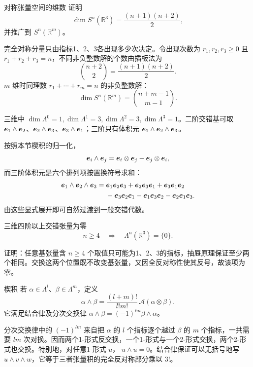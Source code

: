 \begin{advexamplebox}{对称张量空间的维数}\label{advA3:ex:symmetric-dimension}
证明
\[
 \dim S^n(\mathbb R^3)=\frac{(n+1)(n+2)}2,
\]
并推广到 $S^n(\mathbb R^m)$。

\AQSensors
\end{advexamplebox}
\begin{advsolution}
\AASensors

完全对称分量只由指标1、2、3各出现多少次决定。令出现次数为
$r_1,r_2,r_3\ge0$ 且 $r_1+r_2+r_3=n$，不同非负整数解的个数由插板法为
\[
 \binom{n+2}{2}=\frac{(n+1)(n+2)}2.
\]
$m$ 维时同理数 $r_1+\cdots+r_m=n$ 的非负整数解：
\[
 \boxed{\dim S^n(\mathbb R^m)=\binom{n+m-1}{m-1}}.
\]
\end{advsolution}

三维中 $\dim\Lambda^0=1,\dim\Lambda^1=3,\dim\Lambda^2=3,\dim\Lambda^3=1$。二阶交错基可取
$\bm{e}_1\wedge\bm{e}_2$、$\bm{e}_2\wedge\bm{e}_3$、$\bm{e}_3\wedge\bm{e}_1$；三阶只有体积元
$\bm{e}_1\wedge\bm{e}_2\wedge\bm{e}_3$。

按照本节楔积的归一化，
\[
 \bm{e}_i\wedge\bm{e}_j
 =\bm{e}_i\otimes\bm{e}_j-\bm{e}_j\otimes\bm{e}_i,
\]
而三阶体积元是六个排列项按置换符号求和：
\[
 \begin{aligned}
 \bm{e}_1\wedge\bm{e}_2\wedge\bm{e}_3
 ={}&\bm{e}_1\bm{e}_2\bm{e}_3
 +\bm{e}_2\bm{e}_3\bm{e}_1
 +\bm{e}_3\bm{e}_1\bm{e}_2\\
 &-\bm{e}_3\bm{e}_2\bm{e}_1
 -\bm{e}_1\bm{e}_3\bm{e}_2
 -\bm{e}_2\bm{e}_1\bm{e}_3.
 \end{aligned}
\]
由这些显式展开即可自然过渡到一般交错代数。

\begin{advtheorem}{三维四阶以上交错张量为零}\label{advA3:thm:alternating-zero}
\[
 n\ge4\quad\Longrightarrow\quad \Lambda^n(\mathbb R^3)=\{0\}.
\]
\end{advtheorem}
证明：任意基张量含 $n\ge4$ 个取值只可能为1、2、3的指标，抽屉原理保证至少两个相同。交换这两个位置既不改变基张量，又因全反对称性使其反号，故该项为零。

\begin{advdefinition}{楔积}\label{advA3:def:wedge}
若 $\alpha\in\Lambda^l$、$\beta\in\Lambda^m$，定义
\[
 \alpha\wedge\beta=\frac{(l+m)!}{l!m!}\,
 \mathcal A(\alpha\otimes\beta).
\]
它满足结合律及分次交换律
$\alpha\wedge\beta=(-1)^{lm}\beta\wedge\alpha$。
\end{advdefinition}

分次交换律中的 $(-1)^{lm}$ 来自把 $\alpha$ 的 $l$ 个指标逐个越过 $\beta$ 的 $m$ 个指标，一共需要 $lm$ 次对换。因而两个1-形式反交换，一个1-形式与一个2-形式交换，两个2-形式也交换。特别地，对任意1-形式 $u$，
$u\wedge u=0$。结合律保证可以无括号地写
$u\wedge v\wedge w$，它等于三者张量积的完全反对称部分乘以 $3!$。

